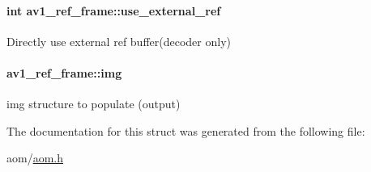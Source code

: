 \paragraph[{\texorpdfstring{use\+\_\+external\+\_\+ref}{use_external_ref}}]{\setlength{\rightskip}{0pt plus 5cm}int av1\+\_\+ref\+\_\+frame\+::use\+\_\+external\+\_\+ref}\hypertarget{structav1__ref__frame_a33749c5c20033cc5f7582d0ec1c34ff0}{}\label{structav1__ref__frame_a33749c5c20033cc5f7582d0ec1c34ff0}
Directly use external ref buffer(decoder only) 
\paragraph[{\texorpdfstring{img}{img}}]{ av1\+\_\+ref\+\_\+frame\+::img}\hypertarget{structav1__ref__frame_a55a09db9e1acdd73e656b01fa01283b3}{}\label{structav1__ref__frame_a55a09db9e1acdd73e656b01fa01283b3}
img structure to populate (output) 

The documentation for this struct was generated from the following file\+:\begin{DoxyCompactItemize}
\item 
aom/\hyperlink{aom_8h}{aom.\+h}\end{DoxyCompactItemize}
